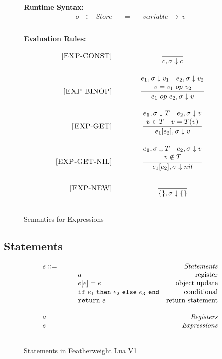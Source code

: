 \documentclass{article}
\begin{document}
\begin{figure}[H]
\caption{Semantics for Expressions}
{\bf Runtime Syntax:}
\label{fig:ExpSem}
\[
\begin{array}{rclcl}
  \sigma & \in & {Store} \quad  & = & \quad {variable} ~\rightarrow ~v \\
  \\
\end{array}
\]

{\bf Evaluation Rules:~~~ } \\
\[
\begin{array}{r@{\qquad\qquad}c}
\ssrule{EXP-CONST}{
}{
  \semanticExp{c}{\sigma}{c}
}
\ssrule{EXP-BINOP}{
  \semanticExp{e_1}{\sigma}{v_1} \quad
  \semanticExp{e_2}{\sigma}{v_2} \\
  v = v_1 ~op~ v_2
}{
  \semanticExp{e_1 ~op~ e_2}{\sigma}{v}
}
\ssrule{EXP-GET}{
  \semanticExp{e_1}{\sigma}{T} \quad
  \semanticExp{e_2}{\sigma}{v} \\
  v \in T \quad
  v = T(v)
}{
  \semanticExp{e_1[e_2]}{\sigma}{v}
}
\ssrule{EXP-GET-NIL}{
  \semanticExp{e_1}{\sigma}{T} \quad
  \semanticExp{e_2}{\sigma}{v} \\
  v \notin T 
}{
  \semanticExp{e_1[e_2]}{\sigma}{nil}
}
\ssrule{EXP-NEW}{
}{
  \semanticExp{\{\}}{\sigma}{\{\}}
}
\end{array}
\]
\end{figure}


\subsection{Statements}



\begin{figure}
\caption{Statements in Featherweight Lua V1}
\label{fig:FWLuaStat}
\[
\begin{array}{llr}
  \mydefhead{s ::=\qquad\qquad\qquad\qquad}{Statements}
  \mydefcase{a}{register}
  \mydefcase{e[e] = e}{object update}
  \mydefcase{\ife {e_1} {e_2} {e_3}}{conditional}
  \mydefcase{{\tt return} ~e}{return statement}
  \\
  \mydefhead{a \qquad\qquad\qquad\qquad}{Registers}
  \mydefhead{e \qquad\qquad\qquad\qquad}{Expressions}
  \\
\end{array}
\]
\end{figure}
\end{document}
